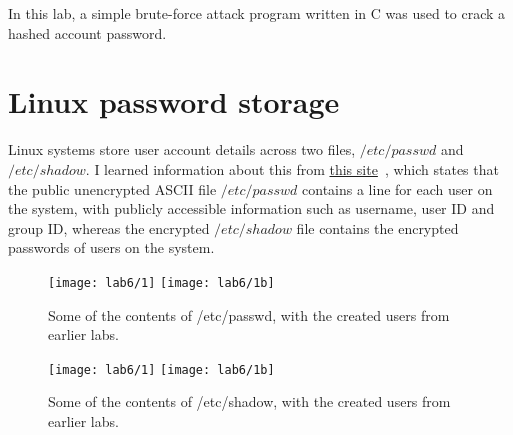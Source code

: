In this lab, a simple brute-force attack program written in C was used to crack a hashed account password.

\section{Linux password storage}\label{sec:linux-password-storage}
Linux systems store user account details across two files, $/etc/passwd$ and $/etc/shadow$.
I learned information about this from
\href{https://www.cyberciti.biz/faq/understanding-etcpasswd-file-format/}{this site}~\autocite{accStorage},
which states that the public unencrypted ASCII file $/etc/passwd$ contains a line for each user on the system,
with publicly accessible information such as username, user ID and group ID, whereas the encrypted $/etc/shadow$
file contains the encrypted passwords of users on the system.

\begin{figure}[H]
    \centering
    \texttt{[image: lab6/1]}
    \texttt{[image: lab6/1b]}
    \caption{Some of the contents of /etc/passwd, with the created users from earlier labs.}
    \label{fig:etcpasswd}
\end{figure}

\begin{figure}[H]
    \centering
    \texttt{[image: lab6/1]}
    \texttt{[image: lab6/1b]}
    \caption{Some of the contents of /etc/shadow, with the created users from earlier labs.}
    \label{fig:etcshadow}
\end{figure}






